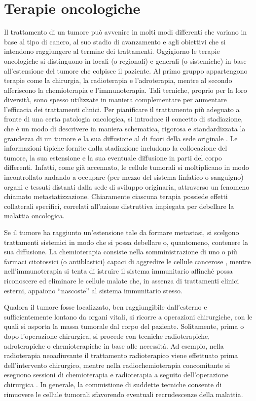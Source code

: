 \documentclass[12pt,a4paper,twoside]{report}
\begin{document}
	\section{Terapie oncologiche}\label{sec:1.2}
	Il trattamento di un tumore può avvenire in molti modi differenti che variano in base al tipo di cancro, al suo stadio di avanzamento e agli obiettivi che si intendono raggiungere al termine dei trattamenti. Oggigiorno le terapie oncologiche si distinguono in locali (o regionali) e generali (o sistemiche) in base all'estensione del tumore che colpisce il paziente. Al primo gruppo appartengono terapie come la chirurgia, la radioterapia e l'adroterapia, mentre al secondo afferiscono la chemioterapia e l'immunoterapia. Tali tecniche, proprio per la loro diversità, sono spesso utilizzate in maniera complementare per aumentare l'efficacia dei trattamenti clinici. Per pianificare il trattamento più adeguato a fronte di una certa patologia oncologica, si introduce il concetto di stadiazione, che è un modo di descrivere in maniera schematica, rigorosa e standardizzata la grandezza di un tumore e la sua diffusione al di fuori della sede originale \cite{airc}. Le informazioni tipiche fornite dalla stadiazione includono la collocazione del tumore, la sua estensione e la sua eventuale diffusione in parti del corpo differenti. Infatti, come già accennato, le cellule tumorali si moltiplicano in modo incontrollato andando a occupare (per mezzo del sistema linfatico o sanguigno) organi e tessuti distanti dalla sede di sviluppo originaria, attraverso un fenomeno chiamato metastatizzazione. Chiaramente ciascuna terapia possiede effetti collaterali specifici, correlati all'azione distruttiva impiegata per debellare la malattia oncologica.
	
	Se il tumore ha raggiunto un'estensione tale da formare metastasi, si scelgono trattamenti sistemici in modo che si possa debellare o, quantomeno, contenere la sua diffusione. La chemioterapia consiste nella somministrazione di uno o più farmaci citotossici (o antiblastici) capaci di aggredire le cellule cancerose \cite{aimac1}, mentre nell'immunoterapia si tenta di istruire il sistema immunitario affinché possa riconoscere ed eliminare le cellule malate che, in assenza di trattamenti clinici esterni, appaiono ``nascoste'' al sistema immunitario stesso.
	
	Qualora il tumore fosse localizzato, ben raggiungibile dall'esterno e sufficientemente lontano da organi vitali, si ricorre a operazioni chirurgiche, con le quali si asporta la massa tumorale dal corpo del paziente. Solitamente, prima o dopo l'operazione chirurgica, si procede con tecniche radioterapiche, adroterapiche o chemioterapiche in base alle necessità. Ad esempio, nella radioterapia neoadiuvante il trattamento radioterapico viene effettuato prima dell'intervento chirurgico, mentre nella radiochemioterapia concomitante si eseguono sessioni di chemioterapia e radioterapia a seguito dell'operazione chirurgica \cite{aimac2}. In generale, la commistione di suddette tecniche consente di rimuovere le cellule tumorali sfavorendo eventuali recrudescenze della malattia.
	
\end{document}
